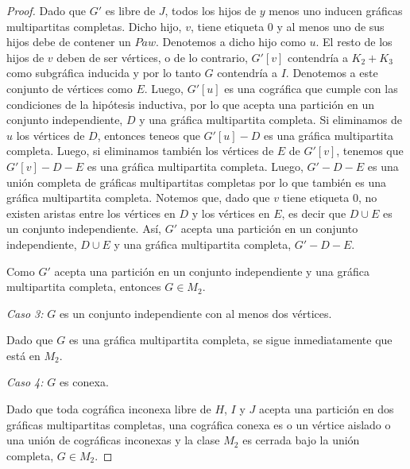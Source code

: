 \begin{proof}
    Dado que $G'$ es libre de $J$, todos los hijos de $y$ menos uno inducen gráficas multipartitas completas. Dicho hijo, $v$, tiene etiqueta 0 y al menos uno de sus hijos debe de contener un $Paw$. Denotemos a dicho hijo como $u$. El resto de los hijos de $v$ deben de ser vértices, o de lo contrario, $G'[v]$ contendría a $K_2 + K_3$ como subgráfica inducida y por lo tanto $G$ contendría a $I$. Denotemos a este conjunto de vértices como $E$. Luego, $G'[u]$  es una cográfica que cumple con las condiciones de la hipótesis inductiva, por lo que acepta una partición en un conjunto independiente, $D$ y una gráfica multipartita completa. Si eliminamos de $u$ los vértices de $D$, entonces teneos que $G'[u] - D$ es una gráfica multipartita completa. Luego, si eliminamos también los vértices de $E$ de $G'[v]$, tenemos que $G'[v]-D-E$ es una gráfica multipartita completa. Luego, $G'-D-E$ es una unión completa de gráficas multipartitas completas por lo que también es una gráfica multipartita completa. Notemos que, dado que $v$ tiene etiqueta 0, no existen aristas entre los vértices en $D$ y los vértices en $E$, es decir que $D \cup E$ es un conjunto independiente. Así, $G'$ acepta una partición en un conjunto independiente, $D \cup E$ y una gráfica multipartita completa, $G' - D - E$.


    Como $G'$ acepta una partición en un conjunto independiente y una gráfica multipartita completa, entonces $G \in M_2$.


    \emph{Caso 3:} $G$ es un conjunto independiente con al menos dos vértices.

    Dado que $G$ es una gráfica multipartita completa, se sigue inmediatamente que está en $M_2$.

    \emph{Caso 4:} $G$ es conexa.

    Dado que toda cográfica inconexa libre de $H$, $I$ y $J$ acepta una partición en dos gráficas multipartitas completas, una cográfica conexa es o un vértice aislado o una unión de cográficas inconexas y la clase $M_2$ es cerrada bajo la unión completa, $G \in M_2$.


\end{proof}
